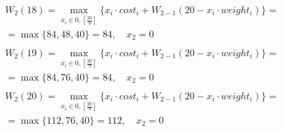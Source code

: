 \documentclass[17pt]{extarticle}
\begin{document}
\[
    \begin{aligned}
         & W_2(18)=\max_{x_i \in \overline{0, \left[\frac{20}{9}\right]}} \{x_i \cdot cost_i + W_{2-1}(20 - x_i \cdot weight_i)\}= \\& = \max \{
        84, 48, 40\}= 84, \quad x_2 = 0                                                                                            \\
    \end{aligned}
\]
\[
    \begin{aligned}
         & W_2(19)=\max_{x_i \in \overline{0, \left[\frac{20}{9}\right]}} \{x_i \cdot cost_i + W_{2-1}(20 - x_i \cdot weight_i)\}= \\& = \max \{
        84, 76, 40\}= 84, \quad x_2 = 0                                                                                            \\
    \end{aligned}
\]
\[
    \begin{aligned}
         & W_2(20)=\max_{x_i \in \overline{0, \left[\frac{20}{9}\right]}} \{x_i \cdot cost_i + W_{2-1}(20 - x_i \cdot weight_i)\}= \\& = \max \{
        112, 76, 40\}= 112, \quad x_2 = 0                                                                                          \\
    \end{aligned}
\]
\end{document}
